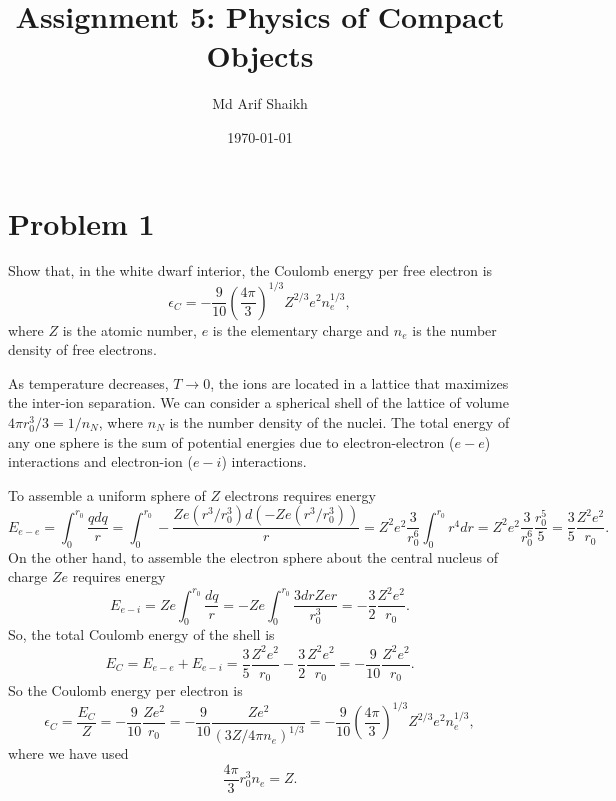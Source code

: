 \documentclass[]{revtex4-2}
\begin{document}
    \title{Assignment 5: Physics of Compact Objects}
    \author{Md Arif Shaikh}
    \date{\today}
    \maketitle
    \section*{Problem 1}
    Show that, in the white dwarf interior, the Coulomb energy per free electron is
    \begin{equation}
      \label{eq:coulomb-energy}
      \epsilon_C = - \frac{9}{10} \left(\frac{4\pi}{3}\right)^{1/3}Z^{2/3}e^2 n_e^{1/3},
    \end{equation}
    where $Z$ is the atomic number, $e$ is the elementary charge and $n_e$ is the number density of free electrons.

\vspace{0.5cm}
    
 As temperature decreases, $T\to0$, the ions are located in a lattice that maximizes the inter-ion separation. We can consider a spherical shell of the lattice of volume $4\pi r_0^3/3 = 1/n_N$, where $n_N$ is the number density of the nuclei. The total energy of any one sphere is the sum of potential energies due to electron-electron ($e-e$) interactions and electron-ion ($e-i$) interactions.

To assemble a uniform sphere of $Z$ electrons requires energy
\begin{equation}
  \label{eq:e-e}
  E_{e-e} = \int_0^{r_0} \frac{q dq}{r} = \int_0^{r_0} - \frac{Ze (r^3/r_0^3)d ( - Ze (r^3/r_0^3))}{r} = Z^2e^2 \frac{3}{r_0^6}\int_0^{r_0} r^4 dr = Z^2e^2 \frac{3}{r_0^6}\frac{r_0^5}{5} = \frac{3}{5}\frac{Z^2e^2}{r_0}.
\end{equation}
On the other hand, to assemble the electron sphere about the central nucleus of charge $Ze$ requires energy
\begin{equation}
  \label{eq:e-i}
  E_{e-i} = Ze \int_0^{r_0} \frac{dq}{r} = - Ze \int_0^{r_0} \frac{3 dr Z e r}{r_0^3} = - \frac{3}{2}\frac{Z^2e^2}{r_0}.
\end{equation}
So, the total Coulomb energy of the shell is
\begin{equation}
  \label{eq:E_tot}
  E_C = E_{e-e} + E_{e-i} =  \frac{3}{5}\frac{Z^2e^2}{r_0} - \frac{3}{2}\frac{Z^2e^2}{r_0} = - \frac{9}{10}\frac{Z^2e^2}{r_0}.
\end{equation}
So the Coulomb energy per electron is
\begin{equation}
  \label{eq:epsilon_c}
  \epsilon_C = \frac{E_C}{Z} = -\frac{9}{10}\frac{Z e^2}{r_0} = - \frac{9}{10}\frac{Z e^2}{(3 Z/4\pi n_e)^{1/3}} = - \frac{9}{10} \left(\frac{4\pi}{3}\right)^{1/3}Z^{2/3}e^2n_e^{1/3},
\end{equation}
where we have used
\begin{equation}
  \label{eq:n_e}
  \frac{4\pi}{3} r_0^3 n_e = Z. 
\end{equation}
\end{document}
